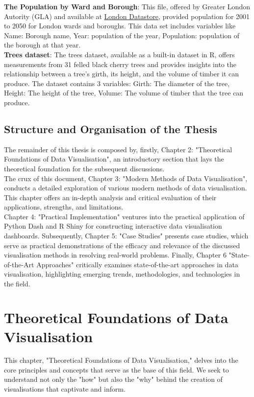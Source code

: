 \documentclass{article}\usepackage[]{graphicx}\usepackage[]{xcolor}
\begin{document}
\noindent
\textbf{The Population by Ward and Borough}: This file, offered by Greater London Autority (GLA) and available at \href{https://data.london.gov.uk/dataset/land-area-and-population-density-ward-and-borough}{London Datastore}, provided population for 2001 to 2050 for London wards and boroughs. This data set includes variables like Name: Borough name, Year: population of the year, Population: population of the borough at that year.\\

\noindent
\textbf{Trees dataset}: The trees dataset, available as a built-in dataset in R, offers measurements from 31 felled black cherry trees and provides insights into the relationship between a tree's girth, its height, and the volume of timber it can produce. The dataset contains 3 variables: Girth: The diameter of the tree, Height: The height of the tree, Volume: The volume of timber that the tree can produce.\\

\subsection{Structure and Organisation of the Thesis}
\noindent The remainder of this thesis is composed by, firstly, Chapter 2: "Theoretical Foundations of Data Visualisation", an introductory section that lays the theoretical foundation for the subsequent discussions.\\

\noindent The crux of this document, Chapter 3: "Modern Methods of Data Visualisation", conducts a detailed exploration of various modern methods of data visualisation. This chapter offers an in-depth analysis and critical evaluation of their applications, strengths, and limitations.\\

\noindent Chapter 4: "Practical Implementation" ventures into the practical application of Python Dash and R Shiny for constructing interactive data visualisation dashboards. Subsequently, Chapter 5: "Case Studies" presents case studies, which serve as practical demonstrations of the efficacy and relevance of the discussed visualisation methods in resolving real-world problems. Finally, Chapter 6 "State-of-the-Art Approaches" critically examines state-of-the-art approaches in data visualisation, highlighting emerging trends, methodologies, and technologies in the field.

\newpage 

\section{Theoretical Foundations of Data Visualisation}
This chapter, "Theoretical Foundations of Data Visualisation," delves into the core principles and concepts that serve as the base of this field. We seek to understand not only the "how" but also the "why" behind the creation of visualisations that captivate and inform.
\end{document}
